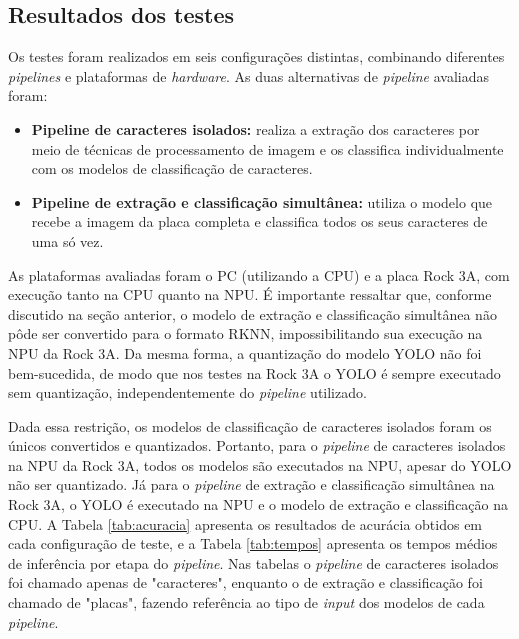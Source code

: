 \subsection{Resultados dos testes}
Os testes foram realizados em seis configurações distintas, combinando diferentes \textit{pipelines} e plataformas de \textit{hardware}. As duas alternativas de \textit{pipeline} avaliadas foram:
\begin{itemize} 
\item \textbf{Pipeline de caracteres isolados:} realiza a extração dos caracteres por meio de técnicas de processamento de imagem e os classifica individualmente com os modelos de classificação de caracteres. 
\item \textbf{Pipeline de extração e classificação simultânea:} utiliza o modelo que recebe a imagem da placa completa e classifica todos os seus caracteres de uma só vez. 
\end{itemize}

As plataformas avaliadas foram o PC (utilizando a CPU) e a placa Rock 3A, com execução tanto na CPU quanto na NPU. É importante ressaltar que, conforme discutido na seção anterior, o modelo de extração e classificação simultânea não pôde ser convertido para o formato RKNN, impossibilitando sua execução na NPU da Rock 3A. Da mesma forma, a quantização do modelo YOLO não foi bem-sucedida, de modo que nos testes na Rock 3A o YOLO é sempre executado sem quantização, independentemente do \textit{pipeline} utilizado.

Dada essa restrição, os modelos de classificação de caracteres isolados foram os únicos convertidos e quantizados. Portanto, para o \textit{pipeline} de caracteres isolados na NPU da Rock 3A, todos os modelos são executados na NPU, apesar do YOLO não ser quantizado. Já para o \textit{pipeline} de extração e classificação simultânea na Rock 3A, o YOLO é executado na NPU e o modelo de extração e classificação na CPU.
A Tabela \ref{tab:acuracia} apresenta os resultados de acurácia obtidos em cada configuração de teste, e a Tabela \ref{tab:tempos} apresenta os tempos médios de inferência por etapa do \textit{pipeline}. Nas tabelas o \textit{pipeline} de caracteres isolados foi chamado apenas de "caracteres", enquanto o de extração e classificação foi chamado de "placas", fazendo referência ao tipo de \textit{input} dos modelos de cada \textit{pipeline}.

